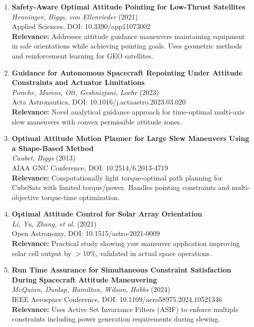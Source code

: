 \documentclass[11pt]{article}
\begin{document}
\begin{enumerate}[label=\textbf{\arabic*.},resume]
    \item \textbf{Safety-Aware Optimal Attitude Pointing for Low-Thrust Satellites}\\
    \textit{Henninger, Biggs, von Ellenrieder} (2021)\\
    Applied Sciences, DOI: 10.3390/app11073002\\
    \textbf{Relevance:} Addresses attitude guidance maneuvers maintaining equipment in safe orientations while achieving pointing goals. Uses geometric methods and reinforcement learning for GEO satellites.

    \item \textbf{Guidance for Autonomous Spacecraft Repointing Under Attitude Constraints and Actuator Limitations}\\
    \textit{Ponche, Marcos, Ott, Geshnizjani, Loehr} (2023)\\
    Acta Astronautica, DOI: 10.1016/j.actaastro.2023.03.020\\
    \textbf{Relevance:} Novel analytical guidance approach for time-optimal multi-axis slew maneuvers with convex permissible attitude zones.

    \item \textbf{Optimal Attitude Motion Planner for Large Slew Maneuvers Using a Shape-Based Method}\\
    \textit{Caubet, Biggs} (2013)\\
    AIAA GNC Conference, DOI: 10.2514/6.2013-4719\\
    \textbf{Relevance:} Computationally light torque-optimal path planning for CubeSats with limited torque/power. Handles pointing constraints and multi-objective torque-time optimization.

    \item \textbf{Optimal Attitude Control for Solar Array Orientation}\\
    \textit{Li, Yu, Zhang, et al.} (2021)\\
    Open Astronomy, DOI: 10.1515/astro-2021-0009\\
    \textbf{Relevance:} Practical study showing yaw maneuver application improving solar cell output by $>$10\%, validated in actual space operations.

    \item \textbf{Run Time Assurance for Simultaneous Constraint Satisfaction During Spacecraft Attitude Maneuvering}\\
    \textit{McQuinn, Dunlap, Hamilton, Wilson, Hobbs} (2024)\\
    IEEE Aerospace Conference, DOI: 10.1109/aero58975.2024.10521346\\
    \textbf{Relevance:} Uses Active Set Invariance Filters (ASIF) to enforce multiple constraints including power generation requirements during slewing.


\end{enumerate}
\end{document}
